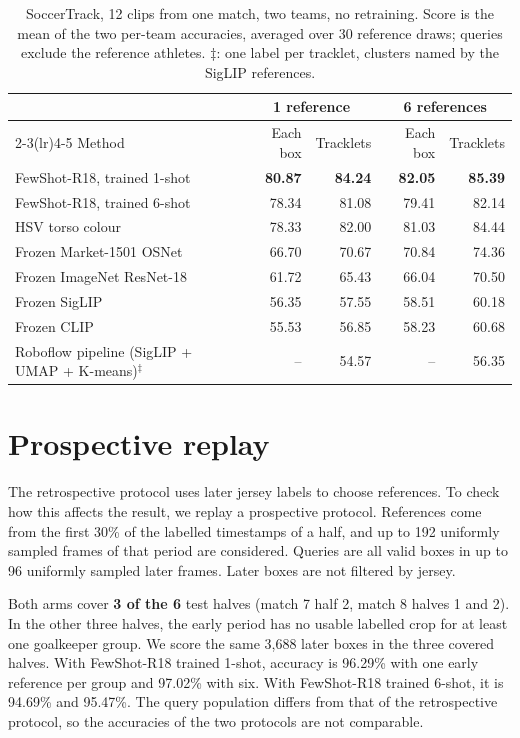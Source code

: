 \documentclass[10pt]{article}
\begin{document}
\begin{table}[tbp]
\centering
\caption{SoccerTrack, 12 clips from one match, two teams, no retraining. Score is the mean of the two per-team accuracies, averaged over 30 reference draws; queries exclude the reference athletes. $\ddagger$: one label per tracklet, clusters named by the SigLIP references.}
\label{tab:transfer}
\small
\begin{tabular}{lrrrr}
\toprule
 & \multicolumn{2}{c}{1 reference} & \multicolumn{2}{c}{6 references} \\
\cmidrule(lr){2-3}\cmidrule(lr){4-5}
Method & Each box & Tracklets & Each box & Tracklets \\
\midrule
FewShot-R18, trained 1-shot & \textbf{80.87} & \textbf{84.24} & \textbf{82.05} & \textbf{85.39} \\
FewShot-R18, trained 6-shot & 78.34 & 81.08 & 79.41 & 82.14 \\
HSV torso colour & 78.33 & 82.00 & 81.03 & 84.44 \\
Frozen Market-1501 OSNet & 66.70 & 70.67 & 70.84 & 74.36 \\
Frozen ImageNet ResNet-18 & 61.72 & 65.43 & 66.04 & 70.50 \\
Frozen SigLIP & 56.35 & 57.55 & 58.51 & 60.18 \\
Frozen CLIP & 55.53 & 56.85 & 58.23 & 60.68 \\
Roboflow pipeline (SigLIP + UMAP + K-means)$^\ddagger$ & -- & 54.57 & -- & 56.35 \\
\bottomrule
\end{tabular}
\end{table}

\section{Prospective replay}
\label{sec:prospective}

The retrospective protocol uses later jersey labels to choose references. To check how this affects the result, we replay a prospective protocol. References come from the first 30\% of the labelled timestamps of a half, and up to 192 uniformly sampled frames of that period are considered. Queries are all valid boxes in up to 96 uniformly sampled later frames. Later boxes are not filtered by jersey.

Both arms cover \textbf{3 of the 6} test halves (match 7 half 2, match 8 halves 1 and 2). In the other three halves, the early period has no usable labelled crop for at least one goalkeeper group. We score the same 3,688 later boxes in the three covered halves. With FewShot-R18 trained 1-shot, accuracy is 96.29\% with one early reference per group and 97.02\% with six. With FewShot-R18 trained 6-shot, it is 94.69\% and 95.47\%. The query population differs from that of the retrospective protocol, so the accuracies of the two protocols are not comparable.
\end{document}
